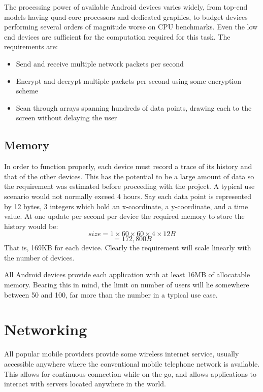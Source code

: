 The processing power of available Android devices varies widely, from top-end models having quad-core processors and dedicated graphics, to budget devices performing several orders of magnitude worse on CPU benchmarks.\cite{cpuBenchmarks} Even the low end devices are sufficient for the computation required for this task. The requirements are:
\begin{itemize}
\item{Send and receive multiple network packets per second}
\item{Encrypt and decrypt multiple packets per second using some encryption scheme}
\item{Scan through arrays spanning hundreds of data points, drawing each to the screen without delaying the user}
\end{itemize}

\subsection{Memory}

In order to function properly, each device must record a trace of its history and that of the other devices. This has the potential to be a large amount of data so the requirement was estimated before proceeding with the project.
A typical use scenario would not normally exceed 4 hours. Say each data point is represented by 12 bytes, 3 integers which hold an x-coordinate, a y-coordinate, and a time value.
At one update per second per device the required memory to store the history would be:
\begin{equation}
size = 1\times60\times60\times4\times12B
\end{equation}
\begin{equation*}
= 172,800B
\end{equation*}
That is, 169KB for each device. Clearly the requirement will scale linearly with the number of devices.

All Android devices provide each application with at least 16MB of allocatable memory. Bearing this in mind, the limit on number of users will lie somewhere between 50 and 100, far more than the number in a typical use case.

\section{Networking}

All popular mobile providers provide some wireless internet service, usually accessible anywhere where the conventional mobile telephone network is available. This allows for continuous connection while on the go, and allows applications to interact with servers located anywhere in the world.

